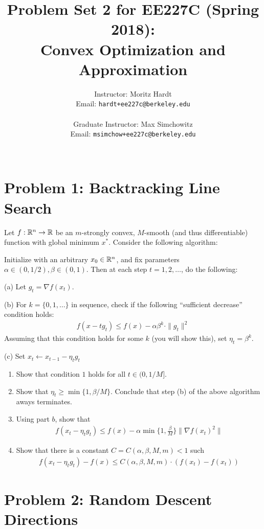 \documentclass[12pt]{article}
\title{Problem Set 2 for EE227C (Spring 2018):\\
 Convex Optimization and Approximation }
\author{Instructor: Moritz Hardt\\
{\small Email: \tt hardt+ee227c@berkeley.edu}\\ ~\\
Graduate Instructor: Max Simchowitz\\
{\small Email: \tt msimchow+ee227c@berkeley.edu}\\ ~\\
}
\begin{document}


\maketitle

\section*{Problem 1: Backtracking Line Search}
	Let $f: \mathbb{R}^n \to \mathbb{R}$ be an $m$-strongly convex, $M$-smooth (and thus differentiable) function with global minimum $x^*$. Consider the following algorithm: 


	Initialize with an arbitrary $x_0 \in \mathbb{R}^n$, and fix parameters $\alpha \in (0,1/2),\beta \in (0,1)$. Then at each step $t = 1,2,\dots$, do the following: 

	(a) Let $g_t = \nabla f(x_t)$. 

	(b) For $k = \{0,1,\dots\}$ in sequence, check if the following ``sufficient decrease'' condition holds:
	\begin{eqnarray}
	f(x - tg_t) \le f(x) - \alpha \beta^k \cdot \|g_t\|^2
	\end{eqnarray}
	Assuming that this condition holds for some $k$ (you will show this), set $\eta_t = \beta^k$. 

	(c) Set $x_t \leftarrow x_{t-1}-\eta_tg_t$
	\begin{enumerate}
		\item Show that condition $1$ holds for all $t \in (0,1/M]$.
		\item Show that $\eta_t \ge \min\{1,\beta/M\}$.
		 Conclude that step (b) of the above algorithm aways terminates.
		\item Using part $b$, show that 
		\begin{eqnarray}
		f(x_t - \eta_t g_t) \le f(x) - \alpha \min\{1,\frac{\beta}{M}\}\|\nabla f(x_t)^2\|
		\end{eqnarray}
		\item Show that there is a constant $C = C(\alpha,\beta,M,m) < 1$ such 
		\begin{eqnarray}
		f(x_t - \eta_t g_t) - f(x) \le C(\alpha,\beta,M,m) \cdot (f(x_t) - f(x_t))
		\end{eqnarray}
	\end{enumerate}


\section*{Problem 2: Random Descent Directions}
\end{document}

